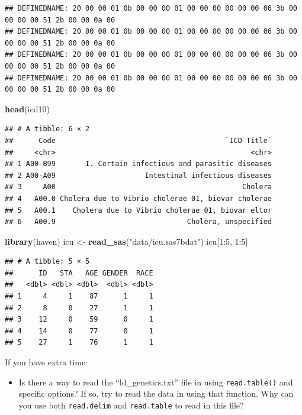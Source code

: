 \documentclass[]{book}
\makeatletter
\newenvironment{Shaded}{\begin{snugshade}}{\end{snugshade}}
\newcommand{\KeywordTok}[1]{\textcolor[rgb]{0.13,0.29,0.53}{\textbf{{#1}}}}
\newcommand{\DecValTok}[1]{\textcolor[rgb]{0.00,0.00,0.81}{{#1}}}
\newcommand{\StringTok}[1]{\textcolor[rgb]{0.31,0.60,0.02}{{#1}}}
\newcommand{\NormalTok}[1]{{#1}}
\providecommand{\tightlist}{%
  \setlength{\itemsep}{0pt}\setlength{\parskip}{0pt}}
\newenvironment{kframe}{%
\medskip{}
\setlength{\fboxsep}{.8em}
 \def\at@end@of@kframe{}%
 \ifinner\ifhmode%
  \def\at@end@of@kframe{\end{minipage}}%
  \begin{minipage}{\columnwidth}%
 \fi\fi%
 \def\FrameCommand##1{\hskip\@totalleftmargin \hskip-\fboxsep
 \colorbox{shadecolor}{##1}\hskip-\fboxsep
     \hskip-\linewidth \hskip-\@totalleftmargin \hskip\columnwidth}%
 \MakeFramed {\advance\hsize-\width
   \@totalleftmargin\z@ \linewidth\hsize
   \@setminipage}}%
 {\par\unskip\endMakeFramed%
 \at@end@of@kframe}
\renewenvironment{Shaded}{\begin{kframe}}{\end{kframe}}
\makeatother
\begin{document}
\begin{verbatim}
## DEFINEDNAME: 20 00 00 01 0b 00 00 00 01 00 00 00 00 00 00 06 3b 00 00 00 00 51 2b 00 00 0a 00 
## DEFINEDNAME: 20 00 00 01 0b 00 00 00 01 00 00 00 00 00 00 06 3b 00 00 00 00 51 2b 00 00 0a 00 
## DEFINEDNAME: 20 00 00 01 0b 00 00 00 01 00 00 00 00 00 00 06 3b 00 00 00 00 51 2b 00 00 0a 00 
## DEFINEDNAME: 20 00 00 01 0b 00 00 00 01 00 00 00 00 00 00 06 3b 00 00 00 00 51 2b 00 00 0a 00
\end{verbatim}

\begin{Shaded}
\begin{Highlighting}[]
\KeywordTok{head}\NormalTok{(icd10)}
\end{Highlighting}
\end{Shaded}

\begin{verbatim}
## # A tibble: 6 × 2
##      Code                                        `ICD Title`
##     <chr>                                              <chr>
## 1 A00-B99       I. Certain infectious and parasitic diseases
## 2 A00-A09                     Intestinal infectious diseases
## 3     A00                                            Cholera
## 4   A00.0 Cholera due to Vibrio cholerae 01, biovar cholerae
## 5   A00.1    Cholera due to Vibrio cholerae 01, biovar eltor
## 6   A00.9                               Cholera, unspecified
\end{verbatim}

\begin{Shaded}
\begin{Highlighting}[]
\KeywordTok{library}\NormalTok{(haven)}
\NormalTok{icu <-}\StringTok{ }\KeywordTok{read_sas}\NormalTok{(}\StringTok{"data/icu.sas7bdat"}\NormalTok{)}
\NormalTok{icu[}\DecValTok{1}\NormalTok{:}\DecValTok{5}\NormalTok{, }\DecValTok{1}\NormalTok{:}\DecValTok{5}\NormalTok{]}
\end{Highlighting}
\end{Shaded}

\begin{verbatim}
## # A tibble: 5 × 5
##      ID   STA   AGE GENDER  RACE
##   <dbl> <dbl> <dbl>  <dbl> <dbl>
## 1     4     1    87      1     1
## 2     8     0    27      1     1
## 3    12     0    59      0     1
## 4    14     0    77      0     1
## 5    27     1    76      1     1
\end{verbatim}

If you have extra time:

\begin{itemize}
\tightlist
\item
  Is there a way to read the ``ld\_genetics.txt'' file in using
  \texttt{read.table()} and specific options? If so, try to read the
  data in using that function. Why can you use both \texttt{read.delim}
  and \texttt{read.table} to read in this file?
\end{itemize}
\end{document}
